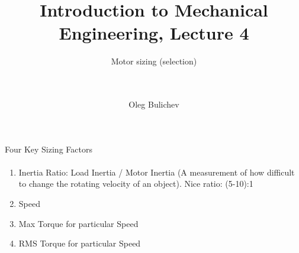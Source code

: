 \documentclass[aspectratio=169]{beamer}
\title[IME]{Introduction to Mechanical Engineering, Lecture 4} %
\subtitle{Motor sizing (selection)
\\ \        \\ \   
         } %
\author{Oleg Bulichev}
\newcommand{\fbckg}[1]{\usebackgroundtemplate{\texttt{[image: \#1]}}}%
\begin{document}
\setlength{\abovedisplayskip}{0pt}
\setlength{\belowdisplayskip}{0pt}
\setlength{\abovedisplayshortskip}{0pt}
\setlength{\belowdisplayshortskip}{0pt}

\fbckg{fibeamer/figs/title_page.png}

\fbckg{fibeamer/figs/common.png}

\note{\scriptsize \begin{itemize}
        \item \ 
    \end{itemize}}

\begin{frame}[t]{Four Key Sizing Factors}
\framesubtitle{}
    \begin{enumerate}
        \item Inertia Ratio: Load Inertia / Motor Inertia (A measurement of how difficult to change the rotating velocity of an object). Nice ratio: (5-10):1
        \item Speed
        \item Max Torque for particular Speed
        \item RMS Torque for particular Speed
    \end{enumerate}
\end{frame}
\end{document}
